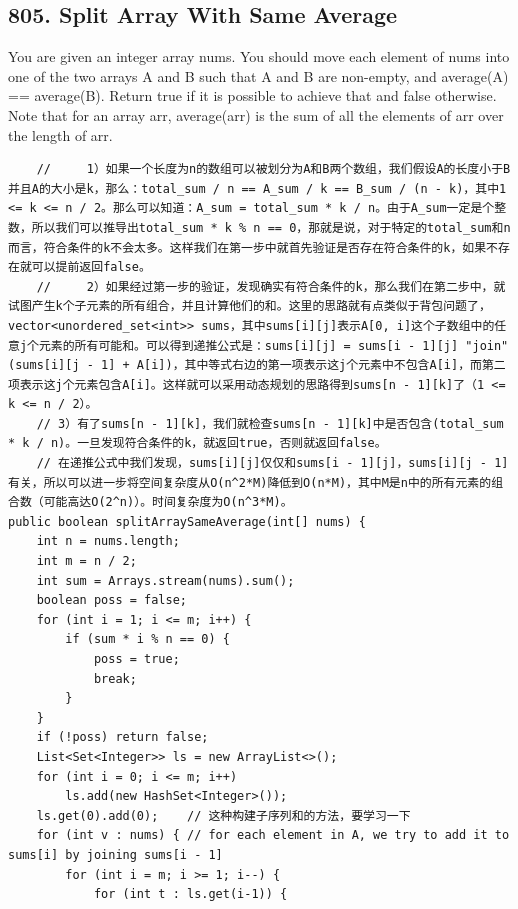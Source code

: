 \documentclass[9pt, b5paper]{article}
\begin{document}
\subsection{805. Split Array With Same Average}
\label{sec-4-43}
You are given an integer array nums.
You should move each element of nums into one of the two arrays A and B such that A and B are non-empty, and average(A) == average(B).
Return true if it is possible to achieve that and false otherwise.
Note that for an array arr, average(arr) is the sum of all the elements of arr over the length of arr.
\begin{verbatim}
    //     1）如果一个长度为n的数组可以被划分为A和B两个数组，我们假设A的长度小于B并且A的大小是k，那么：total_sum / n == A_sum / k == B_sum / (n - k)，其中1 <= k <= n / 2。那么可以知道：A_sum = total_sum * k / n。由于A_sum一定是个整数，所以我们可以推导出total_sum * k % n == 0，那就是说，对于特定的total_sum和n而言，符合条件的k不会太多。这样我们在第一步中就首先验证是否存在符合条件的k，如果不存在就可以提前返回false。
    //     2）如果经过第一步的验证，发现确实有符合条件的k，那么我们在第二步中，就试图产生k个子元素的所有组合，并且计算他们的和。这里的思路就有点类似于背包问题了，vector<unordered_set<int>> sums，其中sums[i][j]表示A[0, i]这个子数组中的任意j个元素的所有可能和。可以得到递推公式是：sums[i][j] = sums[i - 1][j] "join" (sums[i][j - 1] + A[i])，其中等式右边的第一项表示这j个元素中不包含A[i]，而第二项表示这j个元素包含A[i]。这样就可以采用动态规划的思路得到sums[n - 1][k]了（1 <= k <= n / 2）。
    // 3）有了sums[n - 1][k]，我们就检查sums[n - 1][k]中是否包含(total_sum * k / n)。一旦发现符合条件的k，就返回true，否则就返回false。
    // 在递推公式中我们发现，sums[i][j]仅仅和sums[i - 1][j]，sums[i][j - 1]有关，所以可以进一步将空间复杂度从O(n^2*M)降低到O(n*M)，其中M是n中的所有元素的组合数（可能高达O(2^n)）。时间复杂度为O(n^3*M)。
public boolean splitArraySameAverage(int[] nums) {
    int n = nums.length;
    int m = n / 2;
    int sum = Arrays.stream(nums).sum();
    boolean poss = false;
    for (int i = 1; i <= m; i++) {
        if (sum * i % n == 0) {
            poss = true;
            break;
        }
    }
    if (!poss) return false;
    List<Set<Integer>> ls = new ArrayList<>();
    for (int i = 0; i <= m; i++) 
        ls.add(new HashSet<Integer>());
    ls.get(0).add(0);    // 这种构建子序列和的方法，要学习一下
    for (int v : nums) { // for each element in A, we try to add it to sums[i] by joining sums[i - 1]
        for (int i = m; i >= 1; i--) {
            for (int t : ls.get(i-1)) {

\end{verbatim}
\end{document}
